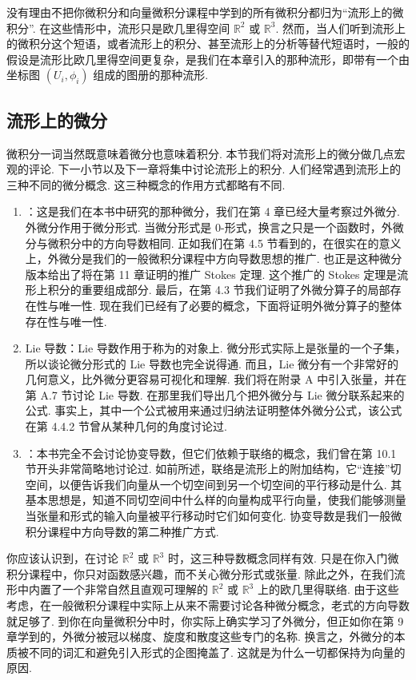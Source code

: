 没有理由不把你微积分和向量微积分课程中学到的所有微积分都归为``流形上的微积分''. 在这些情形中，流形只是欧几里得空间 $\mathbb{R}^2$ 或 $\mathbb{R}^3$. 然而，当人们听到流形上的微积分这个短语，或者流形上的积分、甚至流形上的分析等替代短语时，一般的假设是流形比欧几里得空间更复杂，是我们在本章引入的那种流形，即带有一个由坐标图 $(U_i,\phi_i)$ 组成的图册的那种流形.

\subsection{流形上的微分}

微积分一词当然既意味着微分也意味着积分. 本节我们将对流形上的微分做几点宏观的评论. 下一小节以及下一章将集中讨论流形上的积分. 人们经常遇到流形上的三种不同的微分概念. 这三种概念的作用方式都略有不同.

\begin{enumerate}
  \item {}：这是我们在本书中研究的那种微分，我们在第 4 章已经大量考察过外微分. 外微分作用于微分形式. 当微分形式是 0-形式，换言之只是一个函数时，外微分与微积分中的方向导数相同. 正如我们在第 4.5 节看到的，在很实在的意义上，外微分是我们的一般微积分课程中方向导数思想的推广. 也正是这种微分版本给出了将在第 11 章证明的推广 Stokes 定理. 这个推广的 Stokes 定理是流形上积分的重要组成部分. 最后，在第 4.3 节我们证明了外微分算子的局部存在性与唯一性. 现在我们已经有了必要的概念，下面将证明外微分算子的整体存在性与唯一性.
  \item Lie 导数：Lie 导数作用于称为的对象上. 微分形式实际上是张量的一个子集，所以谈论微分形式的 Lie 导数也完全说得通. 而且，Lie 微分有一个非常好的几何意义，比外微分更容易可视化和理解. 我们将在附录 A 中引入张量，并在第 A.7 节讨论 Lie 导数. 在那里我们导出几个把外微分与 Lie 微分联系起来的公式. 事实上，其中一个公式被用来通过归纳法证明整体外微分公式，该公式在第 4.4.2 节曾从某种几何的角度讨论过.
  \item {}：本书完全不会讨论协变导数，但它们依赖于联络的概念，我们曾在第 10.1 节开头非常简略地讨论过. 如前所述，联络是流形上的附加结构，它``连接''切空间，以便告诉我们向量从一个切空间到另一个切空间的平行移动是什么. 其基本思想是，知道不同切空间中什么样的向量构成平行向量，使我们能够测量当张量和形式的输入向量被平行移动时它们如何变化. 协变导数是我们一般微积分课程中方向导数的第二种推广方式.
\end{enumerate}

你应该认识到，在讨论 $\mathbb{R}^2$ 或 $\mathbb{R}^3$ 时，这三种导数概念同样有效. 只是在你入门微积分课程中，你只对函数感兴趣，而不关心微分形式或张量. 除此之外，在我们流形中内置了一个非常自然且直观可理解的 $\mathbb{R}^2$ 或 $\mathbb{R}^3$ 上的欧几里得联络. 由于这些考虑，在一般微积分课程中实际上从来不需要讨论各种微分概念，老式的方向导数就足够了. 到你在向量微积分中时，你实际上确实学习了外微分，但正如你在第 9 章学到的，外微分被冠以梯度、旋度和散度这些专门的名称. 换言之，外微分的本质被不同的词汇和避免引入形式的企图掩盖了. 这就是为什么一切都保持为向量的原因.

